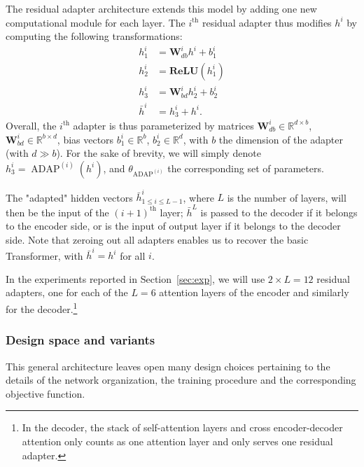 \documentclass[11pt,a4paper]{article}
\newcommand{\fyDone}[1]{\done[FY]\Todo[FY:]{\textcolor{orange}{#1}}}
\begin{document}
The residual adapter architecture extends this model by adding one new computational module for each layer. The $i^{\text{th}}$ residual adapter thus modifies $h^i$ by computing the following transformations:\fyDone{Use align env}
\begin{align*}
  h^{i}_1 &= \mathbf{W}_{db}^{i}h^{i} + b^i_{1} \\
  h^{i}_2 &= \mathbf{ReLU}(h_1^{i})
  \\
  h^{i}_3 &= \mathbf{W}_{bd}^{i}h_2^{i} + b^i_{2} \\
  \bar{h}^{i} &= h^{i}_3 + h^i.
\end{align*}
Overall, the  $i^{\text{th}}$ adapter is thus parameterized by matrices $\displaystyle{\mathbf{W}_{db}^{i}\in\mathbb{R}^{d\times b}}$,$\displaystyle{\mathbf{W}_{bd}^{i}\in\mathbb{R}^{b\times d}}$, bias vectors $\displaystyle{b^i_{1} \in \mathbb{R}^{b}}$, $\displaystyle{b^i_{2} \in \mathbb{R}^{d}}$, with $b$ the dimension of the adapter (with $d \gg b$)\fyDone{Check this}. For the sake of brevity, we will simply denote $h^{i}_3 = \operatorname{ADAP}^{(i)}(h^i)$, and $\theta_{\operatorname{ADAP}^{(i)}}$ the corresponding set of parameters.\fyDone{or is it $h_i$ ?}\fyDone{attention aux matrices $W_i$}

The "adapted" hidden vectors $\bar{h}^i_{ 1\leq i \leq L-1}$, where $L$ is the number of layers, will then be the input of the $(i+1)^{\text{th}}$\fyDone{Self attention ?} layer; $\bar{h}^L$ is passed to the decoder if it belongs to the encoder side, or is the input of output layer if it belongs to the decoder side. Note that zeroing out all adapters enables us to recover the basic Transformer, with $\bar{h}^{i} = h^i$ for all $i$.

In the experiments reported in Section~\ref{sec:exp}, we will use $2\times{}L=12$ residual adapters, one for each of the $L=6$ attention layers of the encoder and similarly for the decoder.\footnote{In the decoder, the stack of self-attention layers and cross encoder-decoder attention only counts as one attention layer and only serves one residual adapter.}

\subsubsection{Design space and variants \label{sssec:design-space}}
This general architecture leaves open many design choices pertaining to the details of the network organization, the training procedure and the corresponding objective function.
\end{document}
